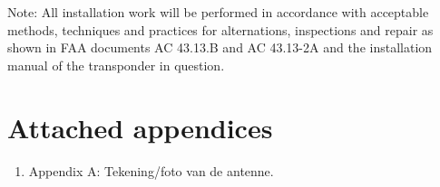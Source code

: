 \documentclass{article}
\begin{document}
Note:
All installation work will be performed in accordance with acceptable methods, techniques and practices for alternations, inspections and repair as shown in FAA documents AC 43.13.B and AC 43.13-2A and the installation manual of the transponder in question.

\section{Attached appendices}
\begin{enumerate}
\item Appendix A: Tekening/foto van de antenne.
\end{enumerate}
\end{document}
